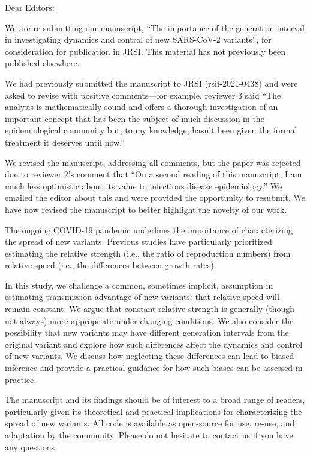 \documentclass[12pt]{article}
\begin{document}
\noindent Dear Editors:

We are re-submitting our manuscript, “The importance of the generation interval in investigating dynamics and control of new SARS-CoV-2 variants”, for consideration for publication in JRSI. This material has not previously been published elsewhere.

We had previously submitted the manuscript to JRSI (rsif-2021-0438) and were asked to revise with positive comments---for example, reviewer 3 said “The analysis is mathematically sound and offers a thorough investigation of an important concept that has been the subject of much discussion in the epidemiological community but, to my knowledge, hasn't been given the formal treatment it deserves until now.” 

We revised the manuscript, addressing all comments, but the paper was rejected due to reviewer 2's comment that “On a second reading of this manuscript, I am much less optimistic about its value to infectious disease epidemiology.” We emailed the editor about this and were provided the opportunity to resubmit. We have now revised the manuscript to better highlight the novelty of our work.

The ongoing COVID-19 pandemic underlines the importance of characterizing the spread of new variants. Previous studies have particularly prioritized estimating the relative strength (i.e., the ratio of reproduction numbers) from relative speed (i.e., the differences between growth rates). 

In this study, we challenge a common, sometimes implicit, assumption in estimating transmission advantage of new variants: that relative speed will remain constant.
We argue that constant relative strength is generally (though not always) more appropriate under changing conditions.
We also consider the possibility that new variants may have different generation intervals from the original variant and explore how such differences affect the dynamics and control of new variants. 
We discuss how neglecting these differences can lead to biased inference and provide a practical guidance for how such biases can be assessed in practice.

The manuscript and its findings should be of interest to a broad range of readers, particularly given its theoretical and practical implications for characterizing the spread of new variants. All code is available as open-source for use, re-use, and adaptation by the community. Please do not hesitate to contact us if you have any questions.
\end{document}
